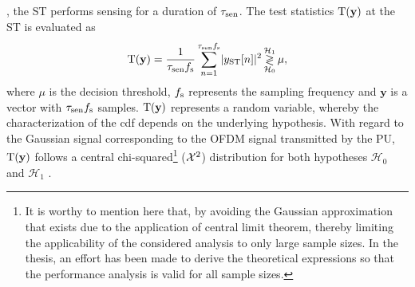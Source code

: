 \subsection{}\label{ssec_IS:pd}
, the ST performs sensing for a duration of $\tau_{\text{sen}}$. The test statistics $\operatorname*{\text{T}(\textbf{y})}$ at the ST is evaluated as   
\begin{align}
\operatorname*{\text{T}(\textbf{y})} = {\frac{1}{{\tau_{\text{sen}} f_{\text{s}}}}\sum_{n=1}^{\tau_{\text{sen}} f_{\text{s}}}} { |y_{\text{ST}}[n]|^2} \mathop{\gtrless}_{\mathcal{H}_0}^{\mathcal{H}_1} \mu, 
\label{eq_IS:test_st}
\end{align}
where $\mu$ is the decision threshold, $f_{\text{s}}$ represents the sampling frequency and $\textbf{y}$ is a vector with $\tau_{\text{sen}} f_{\text{s}}$ samples. $\operatorname*{\text{T}(\textbf{y})}$ represents a random variable, whereby the characterization of the cdf depends on the underlying hypothesis. With regard to the Gaussian signal corresponding to the OFDM signal transmitted by the PU, $\operatorname*{\text{T}(\textbf{y})}$ follows a central chi-squared\footnote{It is worthy to mention here that, by avoiding the Gaussian approximation that exists due to the application of central limit theorem, thereby limiting the applicability of the considered analysis to only large sample sizes. In the thesis, an effort has been made to derive the theoretical expressions so that the performance analysis is valid for all sample sizes.}  ($\cchi2$) distribution for both hypotheses $\mathcal{H}_0$ and $\mathcal{H}_1$ \cite{Kay}. 

